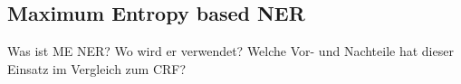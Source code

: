 
\subsection{Maximum Entropy based NER}
Was ist ME NER? Wo wird er verwendet? Welche Vor- und Nachteile hat dieser Einsatz im Vergleich zum CRF?
